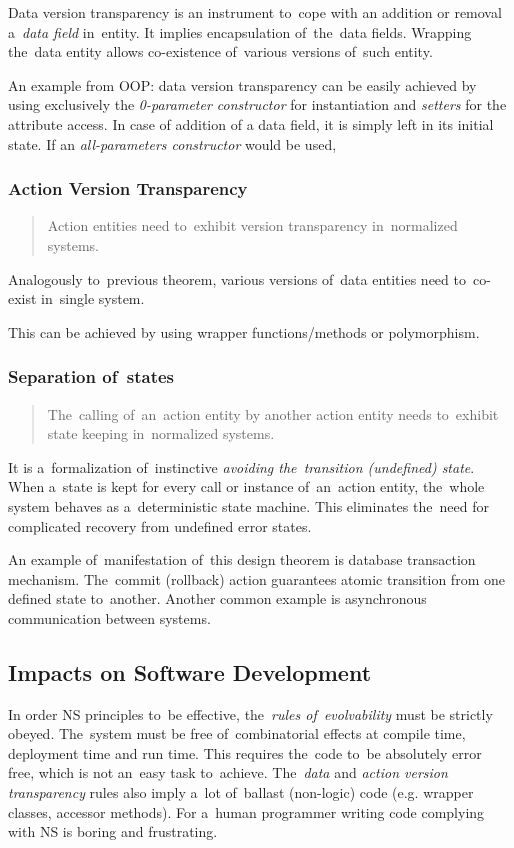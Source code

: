 \documentclass[thesis=M,english,hidelinks]{FITthesis}[2012/10/20]
\begin{document}
Data version transparency is an instrument to~cope with an addition or removal a~\emph{data field} in~entity. It implies encapsulation of~the~data fields. Wrapping the~data entity allows co-existence of~various versions of~such entity.

An example from \acrshort{OOP}: data version transparency can be easily achieved by using exclusively the \textit{0-parameter constructor} for instantiation and \emph{setters} for the attribute access. In case of addition of a data field, it is simply left in its initial state. If an \textit{all-parameters constructor} would be used, 

\subsubsection{Action Version Transparency}
\begin{quote}
Action entities need to~exhibit version transparency in~normalized systems.~\cite{ns-recreating}
\end{quote}

Analogously to~previous theorem, various versions of~data entities need to~co-exist in~single system.

This can be achieved by using wrapper functions/methods or polymorphism.

\subsubsection{Separation of~states}
\begin{quote}
The~calling of~an~action entity by another action entity needs to~exhibit state keeping in~normalized systems.~\cite{ns-recreating}
\end{quote}

It is a~formalization of~instinctive \emph{avoiding the~transition (undefined) state}. When a~state is kept for every call or instance of~an~action entity, the~whole system behaves as a~deterministic state machine. This eliminates the~need for complicated recovery from undefined error states.

An example of~manifestation of~this design theorem is database transaction mechanism. The~commit (rollback) action guarantees atomic transition from one defined state to~another. Another common example is asynchronous communication between systems.

\subsection{Impacts on Software Development}
\label{sec:nsImpacts}
In order \acrshort{NS} principles to~be effective, the~\emph{rules of~evolvability} must be strictly obeyed. The~system must be free of~combinatorial effects at compile time, deployment time and run time. This requires the~code to~be absolutely error free, which is not an~easy task to~achieve. The~\emph{data} and \emph{action version transparency} rules also imply a~lot of~ballast (non-logic) code (e.g. wrapper classes, accessor methods). For a~human programmer writing code complying with \acrshort{NS} is boring and frustrating.
\end{document}
